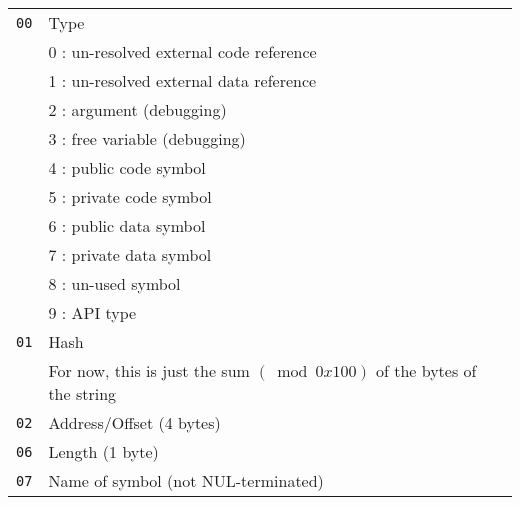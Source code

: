 \documentclass{article}
\begin{document}
\begin{tabular}{rl}
  \texttt{00} & Type \\
  & 0 : un-resolved external code reference \\
  & 1 : un-resolved external data reference \\
  & 2 : argument (debugging) \\
  & 3 : free variable (debugging) \\
  & 4 : public code symbol \\
  & 5 : private code symbol \\
  & 6 : public data symbol \\
  & 7 : private data symbol \\
  & 8 : un-used symbol \\
  & 9 : API type \\
  \texttt{01} & Hash \\
  & For now, this is just the sum $(\bmod 0x100)$ of the bytes of the string \\
  \texttt{02} & Address/Offset (4 bytes) \\
  \texttt{06} & Length (1 byte) \\
  \texttt{07} & Name of symbol (not NUL-terminated) \\
\end{tabular}

\end{document}
